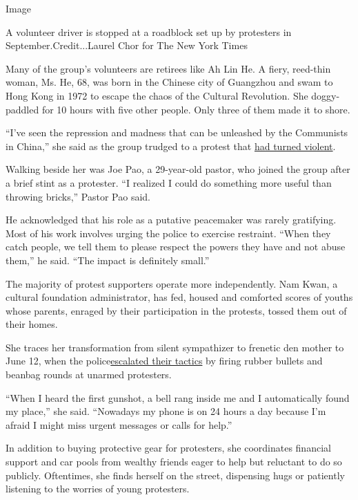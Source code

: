 Image

A volunteer driver is stopped at a roadblock set up by protesters in
September.Credit...Laurel Chor for The New York Times

Many of the group's volunteers are retirees like Ah Lin He. A fiery,
reed-thin woman, Ms. He, 68, was born in the Chinese city of Guangzhou
and swam to Hong Kong in 1972 to escape the chaos of the Cultural
Revolution. She doggy-paddled for 10 hours with five other people. Only
three of them made it to shore.

``I've seen the repression and madness that can be unleashed by the
Communists in China,'' she said as the group trudged to a protest that
\href{https://www.nytimes3xbfgragh.onion/2019/10/07/world/asia/hong-kong-protesters-masks-violence.html}{had
turned violent}.

Walking beside her was Joe Pao, a 29-year-old pastor, who joined the
group after a brief stint as a protester. ``I realized I could do
something more useful than throwing bricks,'' Pastor Pao said.

He acknowledged that his role as a putative peacemaker was rarely
gratifying. Most of his work involves urging the police to exercise
restraint. ``When they catch people, we tell them to please respect the
powers they have and not abuse them,'' he said. ``The impact is
definitely small.''

The majority of protest supporters operate more independently. Nam Kwan,
a cultural foundation administrator, has fed, housed and comforted
scores of youths whose parents, enraged by their participation in the
protests, tossed them out of their homes.

She traces her transformation from silent sympathizer to frenetic den
mother to June 12, when the
police\href{https://www.nytimes3xbfgragh.onion/2019/06/12/world/asia/hong-kong-protests.html}{escalated
their tactics} by firing rubber bullets and beanbag rounds at unarmed
protesters.

``When I heard the first gunshot, a bell rang inside me and I
automatically found my place,'' she said. ``Nowadays my phone is on 24
hours a day because I'm afraid I might miss urgent messages or calls for
help.''

In addition to buying protective gear for protesters, she coordinates
financial support and car pools from wealthy friends eager to help but
reluctant to do so publicly. Oftentimes, she finds herself on the
street, dispensing hugs or patiently listening to the worries of young
protesters.

